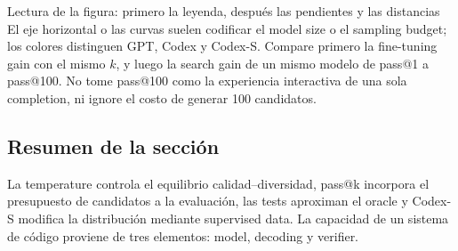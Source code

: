 \begin{knowledgebox}{Lectura de la figura: primero la leyenda, después las pendientes y las distancias}
El eje horizontal o las curvas suelen codificar el model size o el sampling budget; los colores distinguen GPT, Codex y Codex-S. Compare primero la fine-tuning gain con el mismo $k$, y luego la search gain de un mismo modelo de pass@1 a pass@100. No tome pass@100 como la experiencia interactiva de una sola completion, ni ignore el costo de generar 100 candidatos.
\end{knowledgebox}

\subsection{Resumen de la sección}

La temperature controla el equilibrio calidad–diversidad, pass@k incorpora el presupuesto de candidatos a la evaluación, las tests aproximan el oracle y Codex-S modifica la distribución mediante supervised data. La capacidad de un sistema de código proviene de tres elementos: model, decoding y verifier.
